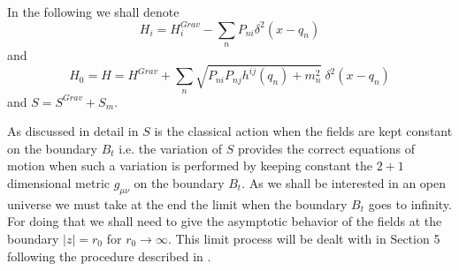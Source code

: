 \documentclass[a4paper,12pt]{article}
\begin{document}
In the following we shall denote
\begin{equation}
H_i=H_i^{Grav}-\sum_n P_{ni}\delta^2(x-q_n)
\end{equation}
and
\begin{equation}
H_0=H=H^{Grav}+\sum_n \sqrt{P_{ni}P_{nj} h^{ij}(q_n)+m^2_n}~\delta^2(x-q_n)
\end{equation}
and $S=S^{Grav}+S_m$.

As discussed in detail in \cite{hawkinghunter,hayward} 
$S$ is the classical action when the fields are kept constant on the
boundary $B_t$ i.e. the variation of $S$ provides the correct
equations of motion when such a variation is performed by keeping
constant the $2+1$ dimensional metric $g_{\mu\nu}$ on the boundary
$B_t$. As we shall be interested in an open universe we must 
take at the end the limit when the boundary $B_t$ goes to
infinity. For doing that we shall need to give the asymptotic
behavior of the fields at the boundary $|z|=r_0$ for $r_0\rightarrow
\infty$. This limit process  will be dealt with in Section 5
following the procedure described in \cite{hawkinghunter}.
\end{document}
